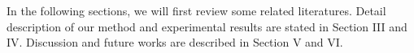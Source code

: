 \documentclass[journal]{IEEEtran}
\begin{document}
In the following sections, we will first review some related literatures. Detail description of our method and experimental results are stated in Section III and IV. Discussion and future works are described in Section V and VI.







%
%

\end{document}
